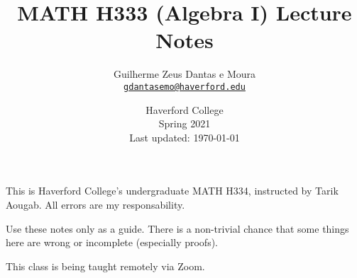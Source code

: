 \documentclass[a4paper, 10pt]{article}
\title{\sffamily \bfseries MATH H333 (Algebra I) Lecture Notes}
\author{\sc Guilherme Zeus Dantas e Moura\\\href{mailto:gdantasemo@haverford.edu}{\texttt{gdantasemo@haverford.edu}}}
\date{Haverford College\\Spring 2021\\ Last updated: \today}
\begin{document}
    \maketitle
	\sloppy
	
		This is Haverford College's undergraduate MATH H334, instructed by Tarik Aougab.
		All errors are my responsability.

		Use these notes only as a guide. There is a non-trivial chance that some things here are wrong or incomplete (especially proofs).

		This class is being taught remotely via Zoom.
		
		\tableofcontents

\end{document}
